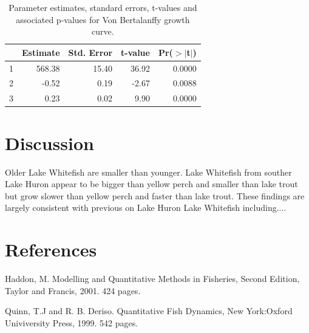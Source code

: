 \documentclass{article}\usepackage[]{graphicx}\usepackage[]{color}
\begin{document}
\begin{table}[ht]
\centering
\begin{tabular}{rrrrr}
  \hline
 & Estimate & Std. Error & t-value & Pr($>$$|$t$|$) \\ 
  \hline
1 & 568.38 & 15.40 & 36.92 & 0.0000 \\ 
  2 & -0.52 & 0.19 & -2.67 & 0.0088 \\ 
  3 & 0.23 & 0.02 & 9.90 & 0.0000 \\ 
   \hline
\end{tabular}
\caption{Parameter estimates, standard errors, t-values and associated p-values for Von Bertalanffy growth curve.} 
\label{tbl:estimates}
\end{table}




\section*{Discussion}
\label{sec:discussion}

Older Lake Whitefish are smaller than younger.  Lake Whitefish from
souther Lake Huron appear to be bigger than yellow perch and smaller
than lake trout but grow slower than yellow perch and faster than lake
trout.  These findings are largely consistent with previous on Lake
Huron Lake Whitefish including....

\cite{.} 





\clearpage
\section*{References}
\label{sec:references}

\vspace{10 mm}

Haddon, M. Modelling and Quantitative Methods in Fisheries, Second Edition, Taylor and Francis, 2001. 424 pages.

\vspace{10 mm}

Quinn, T.J and R. B. Deriso. Quantitative Fish Dynamics, New York:Oxford Univiversity Press, 1999. 542 pages.
\end{document}
